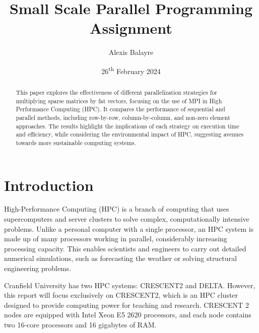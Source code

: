 \documentclass[12pt,oneside]{book} %
\title{Small Scale Parallel Programming Assignment}
\author{Alexis Balayre}
\date{26\textsuperscript{th} February 2024}
\begin{document}
\frontmatter

\maketitle

\begin{abstract}
    This paper explores the effectiveness of different parallelization strategies
    for multiplying sparse matrices by fat vectors, focusing on the use of MPI
    in High Performance Computing (HPC). It compares the performance of sequential
    and parallel methods, including row-by-row, column-by-column, and non-zero element
    approaches. The results highlight the implications of each strategy on execution time
    and efficiency, while considering the environmental impact of HPC, suggesting avenues
    towards more sustainable computing systems.
\end{abstract}

{
\clearpage
\singlespacing
{
    \tableofcontents
}
\clearpage

\listoffigures

\listoftables
}

\mainmatter
\pagestyle{fancy}
\fancyhead[L]{\nouppercase{\leftmark}}
\fancyhead[R]{\nouppercase{\rightmark}}

\chapter{Introduction}
High-Performance Computing (HPC) is a branch of computing that uses
supercomputers and server clusters to solve complex, computationally intensive
problems. Unlike a personal computer with a single processor, an HPC system is
made up of many processors working in parallel, considerably increasing
processing capacity. This enables scientists and engineers to carry out
detailed numerical simulations, such as forecasting the weather or solving
structural engineering problems.

Cranfield University has two HPC systems: CRESCENT2 and DELTA. However, this
report will focus exclusively on CRESCENT2, which is an HPC cluster designed to
provide computing power for teaching and research. CRESCENT 2 nodes are
equipped with Intel Xeon E5 2620 processors, and each node contains two 16-core
processors and 16 gigabytes of RAM.
\end{document}
